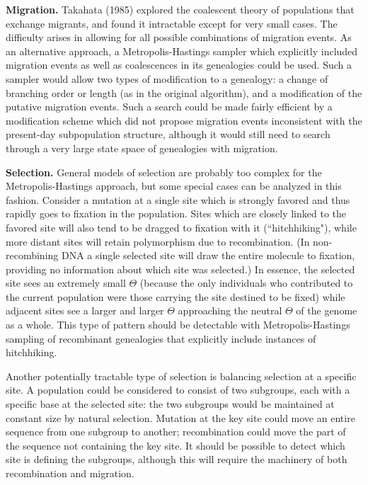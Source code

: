 {\bf Migration.}
Takahata (1985) explored the coalescent theory of populations that
exchange migrants, and found it intractable except for very small cases.
The difficulty arises in allowing for all possible combinations of
migration events.  As an alternative approach, a Metropolis-Hastings
sampler which explicitly included migration events as well as
coalescences in its genealogies could be used.  Such a sampler would
allow two types of modification to a genealogy:  a change of branching
order or length (as in the original algorithm), and a modification of
the putative migration events.  Such a search could be made fairly
efficient by a modification scheme which did not propose migration
events inconsistent with the present-day subpopulation structure,
although it would still need to search through a very large state space
of genealogies with migration.

{\bf Selection.}
General models of selection are probably too complex for the
Metropolis-Hastings approach, but some special cases can be analyzed in
this fashion.  Consider a mutation at a single site which is strongly
favored and thus rapidly goes to fixation in the population.  Sites which
are closely linked to the favored site will also tend to be dragged to
fixation with it (``hitchhiking"), while more distant sites will retain
polymorphism due to recombination.  (In non-recombining DNA a single
selected site will draw the entire molecule to fixation, providing no
information about which site was selected.)  In essence, the selected
site sees an extremely small $\Theta$ (because the only individuals who
contributed to the current population were those
carrying the site destined to be
fixed) while adjacent sites see a larger and larger $\Theta$ 
approaching the neutral $\Theta$ of the genome as a whole.  This type of
pattern should be detectable with Metropolis-Hastings sampling of
recombinant genealogies that explicitly include instances of
hitchhiking.

Another potentially tractable type of selection is balancing selection
at a specific site.  A population could be considered to consist of two
subgroups, each with a specific base at the selected site:  the two
subgroups would be maintained at constant size by natural selection.
Mutation at the key
site could move an entire sequence from one subgroup to another;
recombination could move the part of the sequence not containing the key
site.  It should be possible to detect which site is defining the
subgroups, although this will require the machinery of both
recombination and migration.

